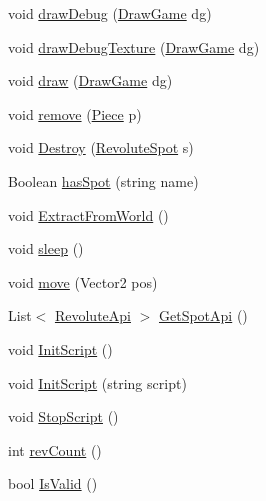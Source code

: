 \begin{DoxyCompactItemize}
\item 
void \hyperlink{classgearit_1_1src_1_1robot_1_1_robot_ab6bbb7f8be1a761c89c752d033da343e}{draw\+Debug} (\hyperlink{classgearit_1_1src_1_1_draw_game}{Draw\+Game} dg)
\item 
void \hyperlink{classgearit_1_1src_1_1robot_1_1_robot_a1a6d789f58adfed9b7d1d303a3a9f120}{draw\+Debug\+Texture} (\hyperlink{classgearit_1_1src_1_1_draw_game}{Draw\+Game} dg)
\item 
void \hyperlink{classgearit_1_1src_1_1robot_1_1_robot_ac2660fc968c5a45753f18718732186cb}{draw} (\hyperlink{classgearit_1_1src_1_1_draw_game}{Draw\+Game} dg)
\item 
void \hyperlink{classgearit_1_1src_1_1robot_1_1_robot_ad710fe35764a4c9b9a8592b5ef84bb78}{remove} (\hyperlink{classgearit_1_1src_1_1robot_1_1_piece}{Piece} p)
\item 
void \hyperlink{classgearit_1_1src_1_1robot_1_1_robot_a2043671ae95e91ba15e81d0bd8089ea0}{Destroy} (\hyperlink{classgearit_1_1src_1_1robot_1_1_revolute_spot}{Revolute\+Spot} s)
\item 
Boolean \hyperlink{classgearit_1_1src_1_1robot_1_1_robot_adb0d689b0376ab03435aa586c3b513ff}{has\+Spot} (string name)
\item 
void \hyperlink{classgearit_1_1src_1_1robot_1_1_robot_a1caf43e0e86dd7b4496ff514012d5b27}{Extract\+From\+World} ()
\item 
void \hyperlink{classgearit_1_1src_1_1robot_1_1_robot_ac3ea0430afb81b56abfd324bbaaad15f}{sleep} ()
\item 
void \hyperlink{classgearit_1_1src_1_1robot_1_1_robot_aaf9a7aeb3822bc050a9323f25423814a}{move} (Vector2 pos)
\item 
List$<$ \hyperlink{classgearit_1_1src_1_1script_1_1_revolute_api}{Revolute\+Api} $>$ \hyperlink{classgearit_1_1src_1_1robot_1_1_robot_a563fe3f12327cc63d73a6c818034e8b1}{Get\+Spot\+Api} ()
\item 
void \hyperlink{classgearit_1_1src_1_1robot_1_1_robot_a7b87738882d4eb4e3dc0660debf7aa3f}{Init\+Script} ()
\item 
void \hyperlink{classgearit_1_1src_1_1robot_1_1_robot_abbb720472fefb50aae4935e7f79fa039}{Init\+Script} (string script)
\item 
void \hyperlink{classgearit_1_1src_1_1robot_1_1_robot_aa7cc9b5606c73f0d474c2a0821cb213f}{Stop\+Script} ()
\item 
int \hyperlink{classgearit_1_1src_1_1robot_1_1_robot_a846f4585c9dabff7be05740bcc4bb746}{rev\+Count} ()
\item 
bool \hyperlink{classgearit_1_1src_1_1robot_1_1_robot_ad5d25dde2531e1db0446c92d0aeda566}{Is\+Valid} ()
\end{DoxyCompactItemize}
